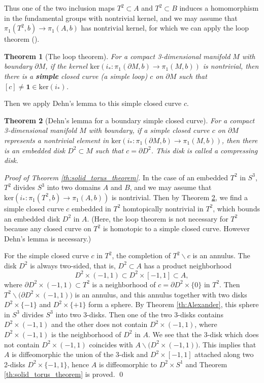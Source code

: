\documentclass{amsart}
\newtheorem{theorem}{Theorem}[section]
\numberwithin{equation}{section}
\newcommand{\lra}{\longrightarrow}
\newcommand{\op}{\mathrm}
\newcommand{\bd}{\partial}
\newcommand{\ssm}{\smallsetminus}
\begin{document}
Thus one of the two inclusion maps $T^2\subset A$ and $T^2\subset B$ induces a homomorphism in the fundamental groups with nontrivial kernel, and 
we may assume that $\pi_1(T^2,b)\lra \pi_1(A,b)$ has nontrivial kernel, for which we can apply the loop theorem (\cite{Papa2}). 

\begin{theorem}[The loop theorem]\label{th:loop_theorem}
For a compact 3-dimensional manifold $M$ with boundary $\bd M$, if the kernel $\op{ker}(i_*:\pi_1(\bd M,b)\lra \pi_1(M,b))$ is nontrivial, then there is a \textbf{simple} closed curve (a simple loop) $c$ on $\bd M$ such that $[c]\neq \mathbf{1}\in \op{ker}(i_*)$. 
\end{theorem}
Then we apply Dehn's lemma to this simple closed curve $c$.
\begin{theorem}[Dehn's lemma for a boundary simple closed curve]\label{th:Dehn}
For a compact 3-dimensional manifold $M$ with boundary, if  a simple closed curve $c$ on $\bd M$ represents a nontrivial element in $\op{ker}(i_*:\pi_1(\bd M,b)\lra \pi_1(M,b))$, then there is an embedded disk $D^2\subset M$ such that $c =\bd D^2$. This disk is called a compressing disk.
\end{theorem}

\textit{Proof} {\textit{of Theorem \ref{th:solid_torus_theorem}.}}
In the case of an embedded $T^2$ in $S^3$, $T^2$ divides $S^3$ into two domains $A$ and $B$, and we may assume that $\op{ker}(i_*:\pi_1(T^2,b)\lra \pi_1(A,b))$ is nontrivial.  Then by Theorem \ref{th:Dehn},  we find a simple closed curve $c$ embedded in $T^2$ homtopically nontrivial in $T^2$, which bounds an embedded disk $D^2$ in $A$. (Here, the loop theorem is not necessary for $T^2$ because any closed curve on  $T^2$ is homotopic to a simple closed curve. However Dehn's lemma is necessary.)

For the simple closed curve $c$ in $T^2$, the completion of $T^2\ssm c$ is an annulus. The disk $D^2$ is always two-sided, that is, $D^2\subset A$ has a product neighborhood $$D^2\times (-1,1)\subset D^2\times [-1,1]\subset A,$$ where $\bd D^2\times (-1,1)\subset T^2$ is a neighborhood of $c=\bd D^2\times \{0\}$ in $T^2$. Then $T^2\ssm \big(\bd D^2\times (-1,1)\big)$ is an annulus, and this annulus together with two disks $D^2\times \{-1\}$ and $D^2\times \{+1\}$ form a sphere. 
By Theorem \ref{th:Alexander}, this sphere in $S^3$ divides $S^3$ into two 3-disks. Then one of the two 3-disks contains $D^2\times (-1,1)$ and the other 
does not contain  $D^2\times (-1,1)$, where $D^2\times (-1,1)$ is the neighborhood of $D^2$ in $A$. We see that the 3-disk which does not contain  $D^2\times (-1,1)$ coincides with $A\ssm \big(D^2\times (-1,1)\big)$.
This implies that $A$ is diffeomorphic the union of the 3-disk and $D^2\times [-1,1]$ attached along two 2-disks $D^2\times \{-1,1\}$, hence $A$ is diffeomorphic to $D^2\times S^1$ and Theorem \ref{th:solid_torus_theorem} is proved.
\hfill \qed\\
\end{document}
